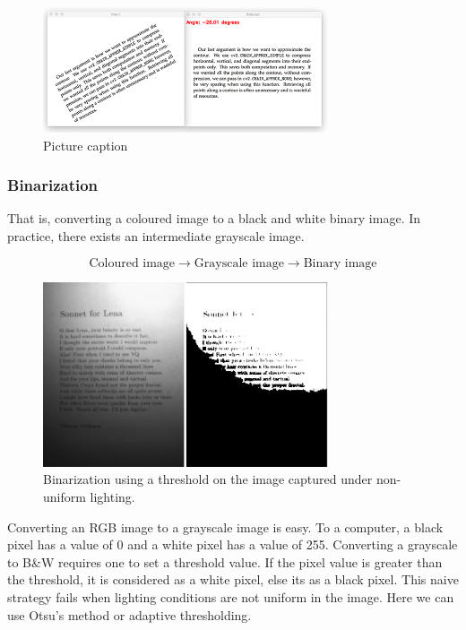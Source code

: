 \documentclass[12pt]{article}
\theoremstyle{mytheoremstyle}
\theoremstyle{mytheoremstyle}
\theoremstyle{myproblemstyle}
\begin{document}
      \begin{figure}[H]
        \includegraphics[width=0.75\textwidth, center]{images/2.png}
        \caption{Picture caption}
      \end{figure}
    
    \subsubsection{Binarization}
      That is, converting a coloured image to a black and white binary image. In practice, there exists an intermediate grayscale image.
      
      \begin{equation*}
        \text{Coloured image} \rightarrow \text{Grayscale image} \rightarrow \text{Binary image}
      \end{equation*}
      
      \begin{figure}[H]
        \centering
        \includegraphics[width=0.75\textwidth]{images/1.jpeg}
        \caption{Binarization using a threshold on the image captured under non-uniform lighting.}
      \end{figure}

      Converting an RGB image to a grayscale image is easy. 
      To a computer, a black pixel has a value of 0 and a white pixel has a value of 255. Converting a grayscale to B\&W requires one to set a threshold value. If the pixel value is greater than the threshold, it is considered as a white pixel, else its as a black pixel. This naive strategy fails when lighting conditions are not uniform in the image. Here we can use Otsu's method or adaptive thresholding.
      
\end{document}
